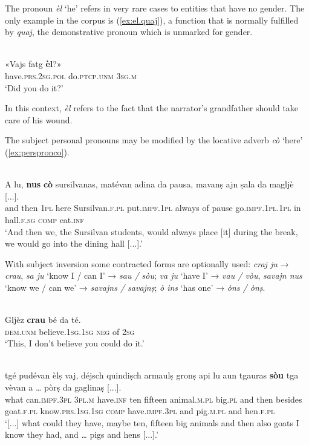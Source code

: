 The pronoun \textit{èl} `he' refers in very rare cases to entities that have no gender. The only example in the corpus is (\ref{ex:el.quaj}), a function that is normally fulfilled by \textit{quaj}, the demonstrative pronoun which is unmarked for gender.

\ea
\label{ex:el.quaj}
\\
\gll «Vajs fatg \textbf{èl}?»\\
have.\textsc{prs.2sg.pol} do.\textsc{ptcp.unm} \textsc{3sg.m}\\
\glt `Did you do it?'
\z

In this context, \textit{èl} refers to the fact that the narrator's grandfather should take care of his wound.

The subject personal pronouns may be modified by the locative adverb \textit{cò} `here' (\ref{ex:perspronco}).

\ea
\label{ex:perspronco}
\\
\gll A lu, \textbf{nus} \textbf{cò} sursilvanas, matévan adina da pausa, mavanṣ ajn ṣala da magljè [...].\\
and then \textsc{1pl} here Sursilvan.\textsc{f.pl} put.\textsc{impf.1pl} always of pause go.\textsc{impf.1pl.1pl} in hall.\textsc{f.sg} \textsc{comp} eat.\textsc{inf}\\
\glt `And then we, the Sursilvan students, would always place [it] during the break, we would go into the dining hall [...].'
\z

With subject inversion some contracted forms are optionally used: \textit{craj ju} → \textit{crau}, \textit{sa ju} `know I / can I' → \textit{sau / sòu}; \textit{va ju} `have I' → \textit{vau / vòu}, \textit{savajn nus} `know we / can we' → \textit{savajns / savajnṣ}; \textit{ò ins} `has one' → \textit{òns / ònṣ}.

\ea
\label{}
\\
\gll Gljèz \textbf{crau} bé da té.\\
\textsc{dem.unm} believe.\textsc{1sg.1sg} \textsc{neg} of \textsc{2sg}\\
\glt `This, I don't believe you could do it.'
\z

\ea
\label{}
\\
\gll   [...] tgé pudévan èlṣ vaj, déjsch quindiṣch armaulṣ gronṣ api lu aun tgauras \textbf{sòu} tga vèvan a … pòrṣ da gaglinaṣ [...]. \\
{} what can.\textsc{impf.3pl} \textsc{3pl.m} have.\textsc{inf} ten fifteen animal.\textsc{m.pl} big.\textsc{pl} and then besides goat.\textsc{f.pl} know.\textsc{prs.1sg.1sg} \textsc{comp} have.\textsc{impf.3pl} and pig.\textsc{m.pl} and hen.\textsc{f.pl}\\
\glt `[...] what could they have, maybe ten, fifteen big animals and then also goats I know they had, and … pigs and hens [...].'
\z

